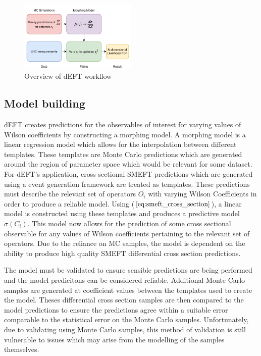 \documentclass[a4paper,11pt]{article}
\begin{document}
\begin{figure}[htb]
    \centering
    \includegraphics[width=0.5\textwidth]{images/deft-workflow.pdf}
    \caption{Overview of dEFT workflow}
\end{figure}

\subsection{Model building}
dEFT creates predictions for the observables of interest for varying values of Wilson coefficients by constructing a morphing model.
A morphing model is a linear regression model which allows for the interpolation between different templates.
These templates are Monte Carlo predictions which are generated around the region of parameter space which would be relevant for some dataset.
For dEFT's application, cross sectional SMEFT predictions which are generated using a event generation framework are treated as templates.
These predictions must describe the relevant set of operators $O_{i}$ with varying Wilson Coefficients in order to produce a reliable model.
Using ($\ref{eq:smeft_cross_section}$), a linear model is constructed using these templates and produces a predictive model $\hat{\sigma}({C_i})$.
This model now allows for the prediction of some cross sectional observable for any values of Wilson coefficients pertaining to the relevant set of operators.
Due to the reliance on MC samples, the model is dependent on the ability to produce high quality SMEFT differential cross section predictions.

The model must be validated to ensure sensible predictions are being performed and the model predicitons can be considered reliable.
Additional Monte Carlo samples are generated at coefficient values between the templates used to create the model.
Theses differential cross section samples are then compared to the model predictions to ensure the predictions agree within a suitable error comparable to the statistical error on the Monte Carlo samples.
Unfortunately, due to validating using Monte Carlo samples, this method of validation is still vulnerable to issues which may arise from the modelling of the samples themselves.
\end{document}
